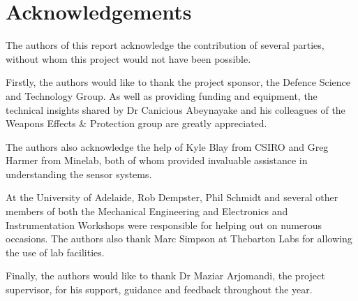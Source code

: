 \documentclass[main.tex]{subfiles}
\begin{document}
{}	%
\chapter*{Acknowledgements} 
The authors of this report acknowledge the contribution of several parties, without whom this project would not have been possible.

Firstly, the authors would like to thank the project sponsor, the Defence Science and Technology Group. As well as providing funding and equipment, the technical insights shared by Dr Canicious Abeynayake and his colleagues of the Weapons Effects \& Protection group are greatly appreciated. 

The authors also acknowledge the help of Kyle Blay from CSIRO and Greg Harmer from Minelab, both of whom provided invaluable assistance in understanding the sensor systems.

At the University of Adelaide, Rob Dempster, Phil Schmidt and several other members of both the Mechanical Engineering and Electronics and Instrumentation Workshops were responsible for helping out on numerous occasions. The authors also thank Marc Simpson at Thebarton Labs for allowing the use of lab facilities. 

Finally, the authors would like to thank Dr Maziar Arjomandi, the project supervisor, for his support, guidance and feedback throughout the year. 
\newpage

{}	%
\renewcommand{\baselinestretch}{1.2}\normalsize 	%
\tableofcontents
\renewcommand{\baselinestretch}{1.3}\normalsize 	%
\newpage

{}	%
\listoffigures
\newpage

{}	%
\listoftables
\newpage


\renewcommand{\nomname}{List of Acronyms}
\printnomenclature
\newpage
\end{document}
